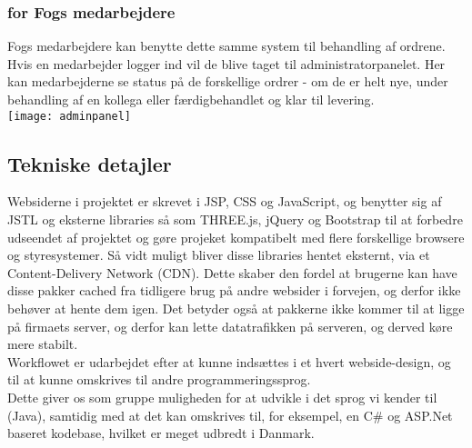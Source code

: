 \subsubsection{for Fogs medarbejdere}
Fogs medarbejdere kan benytte dette samme system til behandling af ordrene. Hvis en medarbejder logger ind vil de blive taget til administratorpanelet. Her kan medarbejderne se status på de forskellige ordrer - om de er helt nye, under behandling af en kollega eller færdigbehandlet og klar til levering.\\
\texttt{[image: adminpanel]}\\
\subsection{Tekniske detajler}
Websiderne i projektet er skrevet i JSP, CSS og JavaScript, og benytter sig af JSTL og eksterne libraries så som THREE.js, jQuery og Bootstrap til at forbedre udseendet af projektet og gøre projeket kompatibelt med flere forskellige browsere og styresystemer. Så vidt muligt bliver disse libraries hentet eksternt, via et Content-Delivery Network (CDN). Dette skaber den fordel at brugerne kan have disse pakker cached fra tidligere brug på andre websider i forvejen, og derfor ikke behøver at hente dem igen. Det betyder også at pakkerne ikke kommer til at ligge på firmaets server, og derfor kan lette datatrafikken på serveren, og derved køre mere stabilt.\\
Workflowet er udarbejdet efter at kunne indsættes i et hvert webside-design, og til at kunne omskrives til andre programmeringssprog.\\
Dette giver os som gruppe muligheden for at udvikle i det sprog vi kender til (Java), samtidig med at det kan omskrives til, for eksempel, en C\# og ASP.Net baseret kodebase, hvilket er meget udbredt i Danmark.